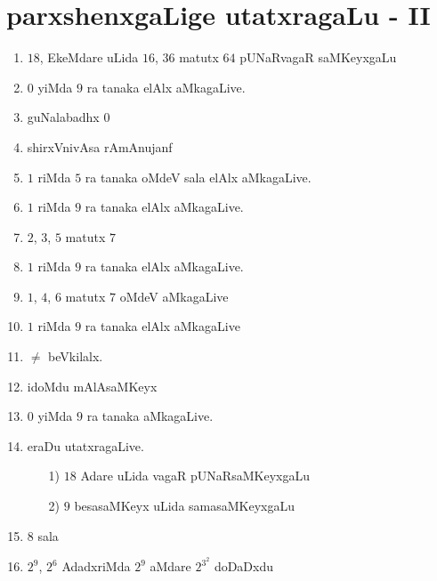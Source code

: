 \chapter{parxshenxgaLige utatxragaLu - {\rm II}}

\begin{enumerate}
  \renewcommand{\labelenumi}{\rm(\theenumi)}
  \itemsep=1pt
\item $18$, EkeMdare uLida $16$, $36$ matutx $64$ pUNaRvagaR saMKeyxgaLu 

\item $0$ yiMda $9$ ra tanaka elAlx aMkagaLive.

\item guNalabadhx $0$

\item shirxVnivAsa rAmAnujanf

\item $1$ riMda $5$ ra tanaka oMdeV sala elAlx aMkagaLive.

\item $1$ riMda $9$ ra tanaka elAlx aMkagaLive.

\item $2$, $3$, $5$ matutx $7$

\item $1$ riMda $9$ ra tanaka elAlx aMkagaLive.

\item $1$, $4$, $6$ matutx $7$ oMdeV aMkagaLive

\item $1$ riMda $9$ ra tanaka elAlx aMkagaLive

\item $\neq$ beVkilalx.

 \item idoMdu mAlAsaMKeyx

\item $0$ yiMda $9$ ra tanaka aMkagaLive.

  \newpage
  
\item eraDu utatxragaLive.
  \begin{itemize}
  \item[{\rm 1)}] $18$ Adare uLida vagaR pUNaRsaMKeyxgaLu

  \item[{\rm 2)}] $9$ besasaMKeyx uLida samasaMKeyxgaLu
      \end{itemize}

\item $8$ sala 

  
\item $2^9$, $2^6$ AdadxriMda $2^9$ aMdare $2^{3^2}$ doDaDxdu


\end{enumerate}

